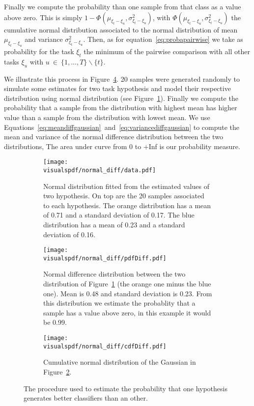 Finally we compute the probability than one sample from that class as a value above zero. This is simply $1 - \Phi(\mu_{\xi_t - \xi_u}, \sigma^2_{\xi_t - \xi_u})$, with $\Phi(\mu_{\xi_t - \xi_u}, \sigma^2_{\xi_t - \xi_u})$ the cumulative normal distribution associated to the normal distribution of mean $\mu_{\xi_t - \xi_u}$ and variance $\sigma^2_{\xi_t - \xi_u}$. Then, as for equation~\ref{eq:probapairwise} we take as probability for the task  $\xi_t$ the minimum of the pairwise comparison with all other tasks $\xi_u$ with $u~\in~\{1, \ldots, T\} \smallsetminus \{t\}$.


We illustrate this process in Figure~\ref{fig:normaldifferencedistribution}. 20 samples were generated randomly to simulate some estimates for two task hypothesis and model their respective distribution using normal distribution (see Figure~\ref{fig:normaldifferencedistribution:data}). Finally we compute the probability that a sample from the distribution with highest mean has higher value than a sample from the distribution with lowest mean. We use Equations~\ref{eq:meandiffgaussian}~and~\ref{eq:variancediffgaussian} to compute the mean and variance of the normal difference distribution between the two distributions, The area under curve from 0 to +Inf is our probability measure.

\begin{figure}[!ht]
\centering
    \begin{subfigure}[b]{\columnwidth}
        \centering
        \texttt{[image: \\visualspdf/normal\_diff/data.pdf]}
        \caption{Normal distribution fitted from the estimated values of two hypothesis. On top are the 20 samples associated to each hypothesis. The orange distribution has a mean of 0.71 and a standard deviation of 0.17. The blue distribution has a mean of 0.23 and a standard deviation of 0.16.}
        \label{fig:normaldifferencedistribution:data}
    \end{subfigure}
    \begin{subfigure}[b]{\columnwidth}
        \centering
        \texttt{[image: \\visualspdf/normal\_diff/pdfDiff.pdf]}
        \caption{Normal difference distribution between the two distribution of Figure~\ref{fig:normaldifferencedistribution:data} (the orange one minus the blue one). Mean is 0.48 and standard deviation is 0.23. From this distribution we estimate the probablity that a sample has a value above zero, in this example it would be 0.99.}
        \label{fig:normaldifferencedistribution:pdf}
    \end{subfigure}
    \begin{subfigure}[b]{\columnwidth}
        \centering
        \texttt{[image: \\visualspdf/normal\_diff/cdfDiff.pdf]}
        \caption{Cumulative normal distribution of the Gaussian in Figure~\ref{fig:normaldifferencedistribution:pdf}.}
        \label{fig:normaldifferencedistribution:cdf}
    \end{subfigure}
\caption{The procedure used to estimate the probability that one hypothesis generates better classifiers than an other.}
\label{fig:normaldifferencedistribution}
\end{figure}

